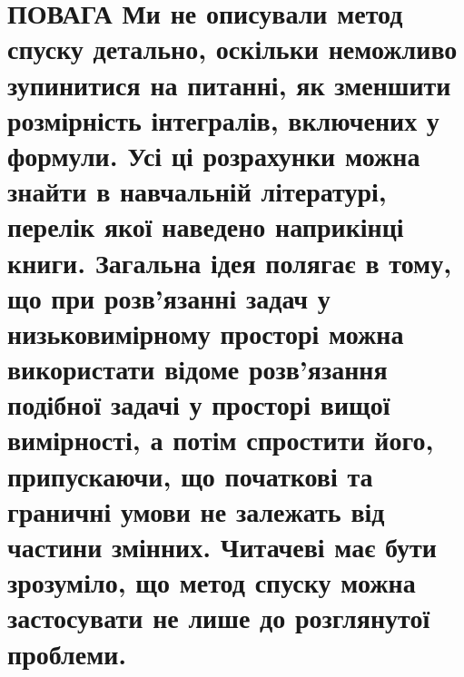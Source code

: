 \documentclass[
  ukrainian,
]{article}
\begin{document}
\section{ПОВАГА Ми не описували метод спуску детально, оскільки
неможливо зупинитися на питанні, як зменшити розмірність інтегралів,
включених у формули. Усі ці розрахунки можна знайти в навчальній
літературі, перелік якої наведено наприкінці книги. Загальна ідея
полягає в тому, що при розв'язанні задач у низьковимірному просторі
можна використати відоме розв'язання подібної задачі у просторі вищої
вимірності, а потім спростити його, припускаючи, що початкові та
граничні умови не залежать від частини змінних. Читачеві має бути
зрозуміло, що метод спуску можна застосувати не лише до розглянутої
проблеми.}\label{ux43fux43eux432ux430ux433ux430-ux43cux438-ux43dux435-ux43eux43fux438ux441ux443ux432ux430ux43bux438-ux43cux435ux442ux43eux434-ux441ux43fux443ux441ux43aux443-ux434ux435ux442ux430ux43bux44cux43dux43e-ux43eux441ux43aux456ux43bux44cux43aux438-ux43dux435ux43cux43eux436ux43bux438ux432ux43e-ux437ux443ux43fux438ux43dux438ux442ux438ux441ux44f-ux43dux430-ux43fux438ux442ux430ux43dux43dux456-ux44fux43a-ux437ux43cux435ux43dux448ux438ux442ux438-ux440ux43eux437ux43cux456ux440ux43dux456ux441ux442ux44c-ux456ux43dux442ux435ux433ux440ux430ux43bux456ux432-ux432ux43aux43bux44eux447ux435ux43dux438ux445-ux443-ux444ux43eux440ux43cux443ux43bux438.-ux443ux441ux456-ux446ux456-ux440ux43eux437ux440ux430ux445ux443ux43dux43aux438-ux43cux43eux436ux43dux430-ux437ux43dux430ux439ux442ux438-ux432-ux43dux430ux432ux447ux430ux43bux44cux43dux456ux439-ux43bux456ux442ux435ux440ux430ux442ux443ux440ux456-ux43fux435ux440ux435ux43bux456ux43a-ux44fux43aux43eux457-ux43dux430ux432ux435ux434ux435ux43dux43e-ux43dux430ux43fux440ux438ux43aux456ux43dux446ux456-ux43aux43dux438ux433ux438.-ux437ux430ux433ux430ux43bux44cux43dux430-ux456ux434ux435ux44f-ux43fux43eux43bux44fux433ux430ux454-ux432-ux442ux43eux43cux443-ux449ux43e-ux43fux440ux438-ux440ux43eux437ux432ux44fux437ux430ux43dux43dux456-ux437ux430ux434ux430ux447-ux443-ux43dux438ux437ux44cux43aux43eux432ux438ux43cux456ux440ux43dux43eux43cux443-ux43fux440ux43eux441ux442ux43eux440ux456-ux43cux43eux436ux43dux430-ux432ux438ux43aux43eux440ux438ux441ux442ux430ux442ux438-ux432ux456ux434ux43eux43cux435-ux440ux43eux437ux432ux44fux437ux430ux43dux43dux44f-ux43fux43eux434ux456ux431ux43dux43eux457-ux437ux430ux434ux430ux447ux456-ux443-ux43fux440ux43eux441ux442ux43eux440ux456-ux432ux438ux449ux43eux457-ux432ux438ux43cux456ux440ux43dux43eux441ux442ux456-ux430-ux43fux43eux442ux456ux43c-ux441ux43fux440ux43eux441ux442ux438ux442ux438-ux439ux43eux433ux43e-ux43fux440ux438ux43fux443ux441ux43aux430ux44eux447ux438-ux449ux43e-ux43fux43eux447ux430ux442ux43aux43eux432ux456-ux442ux430-ux433ux440ux430ux43dux438ux447ux43dux456-ux443ux43cux43eux432ux438-ux43dux435-ux437ux430ux43bux435ux436ux430ux442ux44c-ux432ux456ux434-ux447ux430ux441ux442ux438ux43dux438-ux437ux43cux456ux43dux43dux438ux445.-ux447ux438ux442ux430ux447ux435ux432ux456-ux43cux430ux454-ux431ux443ux442ux438-ux437ux440ux43eux437ux443ux43cux456ux43bux43e-ux449ux43e-ux43cux435ux442ux43eux434-ux441ux43fux443ux441ux43aux443-ux43cux43eux436ux43dux430-ux437ux430ux441ux442ux43eux441ux443ux432ux430ux442ux438-ux43dux435-ux43bux438ux448ux435-}
\end{document}
